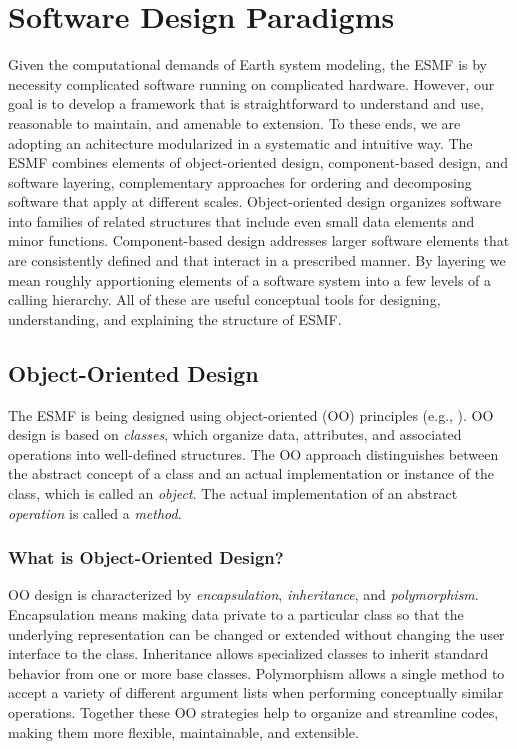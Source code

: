 \section{Software Design Paradigms}
\label{sec:strategies}

Given the computational demands of Earth system modeling, the ESMF is by 
necessity complicated software running on complicated hardware.  However,
our goal is to develop a framework that is straightforward to understand and 
use, reasonable to maintain, and amenable to extension.  
To these ends, we are adopting an achitecture modularized in a  
systematic and intuitive way.  The ESMF combines elements of 
object-oriented design, component-based design, and software layering, 
complementary approaches for ordering and decomposing software that apply
at different scales.  Object-oriented design organizes software into families 
of related structures that include even 
small data elements and minor functions.  Component-based design addresses 
larger software elements that are consistently defined and that interact
in a prescribed manner.  By layering we mean roughly apportioning elements 
of a software system into a few levels of a calling hierarchy.
All of these are useful conceptual tools for designing, understanding, and
explaining the structure of ESMF.

\subsection{Object-Oriented Design}
\label{sec:oop}

The ESMF is being designed using object-oriented (OO) principles (e.g.,
\cite{booch, rumbaugh}).  OO design
is based on {\it classes}, which organize data, attributes, and associated 
operations into well-defined structures.  The OO approach distinguishes between 
the abstract concept of a class and an actual implementation or instance of the 
class, which is called an {\it object}.  The actual implementation of an 
abstract {\it operation} is called a {\it method}.

\subsubsection{What is Object-Oriented Design?}

OO design is characterized by {\it encapsulation}, {\it inheritance}, and 
{\it polymorphism}.  Encapsulation means making data 
private to a particular class so that the underlying representation
can be changed or extended without changing the user interface to the class.
Inheritance allows specialized classes to inherit standard behavior from one
or more base
classes.  Polymorphism allows a single method to accept a variety of 
different argument lists when performing conceptually similar operations.  
Together these OO strategies help to organize and streamline codes, making 
them more flexible, maintainable, and extensible.  

